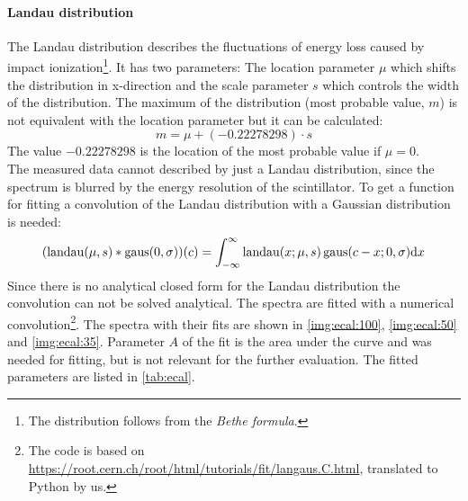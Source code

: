 \paragraph{Landau distribution}
The Landau distribution describes the fluctuations of energy loss caused by impact 
ionization\footnote{The distribution follows from the \emph{Bethe formula}.}. It has two parameters: The location parameter $\mu$ which shifts the 
distribution in x-direction and the scale parameter $s$ which controls the width of the distribution. The maximum of the distribution 
(most probable value, $m$) is not equivalent with the location parameter but it can be calculated:
\begin{equation}
    m = \mu + (-0.22278298) \cdot s
\end{equation}
The value $-0.22278298$ is the location of the most probable value if $\mu = 0$. \\
The measured data cannot described by just a Landau distribution, since the spectrum is blurred by the energy resolution of the scintillator. 
To get a function for fitting a convolution of the Landau distribution with a Gaussian distribution is needed:
\begin{equation}
    \label{eq:landaugausconv}
    (\operatorname{landau}(\mu, s) *  \operatorname{gaus}(0, \sigma))(c) = \int_{-\infty}^{\infty} \operatorname{landau}(x;\mu, s) \operatorname{gaus}(c-x;0,\sigma)\mathrm{d} x
\end{equation}
Since there is no analytical closed form for the Landau distribution the convolution can not be solved analytical. The spectra are fitted with a
numerical convolution\footnote{The code is based on \url{https://root.cern.ch/root/html/tutorials/fit/langaus.C.html}, translated to Python by us.}. 
The spectra with their fits are shown in \autoref{img:ecal:100}, \autoref{img:ecal:50} and \autoref{img:ecal:35}. Parameter $A$ of the fit 
is the area under the curve and was needed for fitting, but is not relevant for the further evaluation. The fitted parameters are listed in 
\autoref{tab:ecal}.

